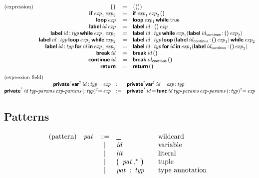 $$
\begin{array}{@{}lrcl@{}}
\text{(expression)} &
\K\{ \K\} &:=&
  \K\{ \K{()} \K\} \\&
\KK{if} \x{exp}_1 \x{exp}_2 &:=&
  \KK{if} \x{exp}_1 \x{exp}_2 \K{()} \\&
\KK{loop} \x{exp} &:=&
  \KK{loop} \x{exp}_1 \KK{while} \; \K{true} \\&
\KK{label} \x{id} \x{exp} &:=&
  \KK{label} \x{id} \K:\; \K{()} \x{exp} \\&
\KK{label} \x{id} \K: \x{typ} \KK{while} \x{exp}_1 \x{exp}_2 &:=&
  \KK{label} \x{id} \K: \x{typ} \KK{while} \x{exp}_1 (\KK{label} \x{id}_{\K{continue}} \K: \, \K{()} \x{exp}_2) \\&
\KK{label} \x{id} \K: \x{typ} \KK{loop} \x{exp}_1 \KK{while} \x{exp}_2 &:=&
  \KK{label} \x{id} \K: \x{typ} \KK{loop} \, (\KK{label} \x{id}_{\K{continue}} \K: \, \K{()} \x{exp}_1) \, \KK{while} \x{exp}_2 \\&
\KK{label} \x{id} \K: \x{typ} \KK{for} \x{id} \KK{in} \x{exp}_1 \x{exp}_2 &:=&
  \KK{label} \x{id} \K: \x{typ} \KK{for} \x{id} \KK{in} \x{exp}_1 (\KK{label} \x{id}_{\K{continue}} \K: \, \K{()} \x{exp}_2) \\&
\KK{break} \x{id} &:=&
  \KK{break} \x{id} \K{()} \\&
\KK{continue} \x{id} &:=&
  \KK{break} \x{id}_{\K{continue}} \K{()} \\&
\KK{return} &:=&
  \KK{return} \, \K{()} \\
\end{array}
$$
$$
\begin{array}{@{}rcl@{}}
\text{(expression field)} \hfill \\
\KK{private}^? \KK{var}^? \x{id} \K: \x{typ} \K= \x{exp} &:=&
  \KK{private}^? \KK{var}^? \x{id} \K= \x{exp} \K: \x{typ} \\
\KK{private}^? \x{id} \x{typ-params} \x{exp-params} \, (\K: \x{typ})^? \K= \x{exp} &:=&
  \KK{private}^? \x{id} \K= \, \KK{func} \x{id} \x{typ-params} \x{exp-params} \, (\K: \x{typ})^? \K= \x{exp} \\
\end{array}
$$


\subsection*{Patterns}

$$
\begin{array}{@{}lrcl@{\qquad}l}
\text{(pattern)} & \x{pat} &::=&
  \K\textunderscore
    & \text{wildcard} \\&&|&
  \x{id}
    & \text{variable} \\&&|&
  \x{lit}
    & \text{literal} \\&&|&
  \K(~\x{pat}\K,^\ast~\K)
    & \text{tuple} \\&&|&
  \x{pat}~\K:~\x{typ}
    & \text{type annotation} \\
\end{array}
$$


